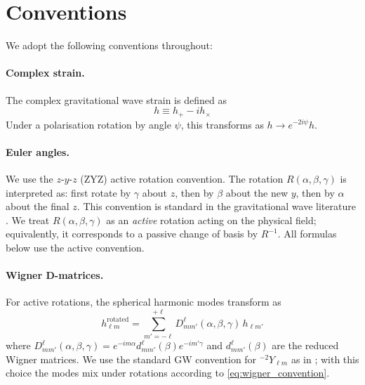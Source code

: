 \documentclass[11pt,a4paper]{article}
\newcommand{\Ylm}{{}^{-2}Y_{\ell m}}
\begin{document}
\section{Conventions}
\label{sec:conventions}

We adopt the following conventions throughout:

\paragraph{Complex strain.} The complex gravitational wave strain is defined as
\begin{equation}
    h \equiv h_+ - i h_\times
    \label{eq:strain_def}
\end{equation}
Under a polarisation rotation by angle $\psi$, this transforms as $h \to e^{-2i\psi} h$.

\paragraph{Euler angles.} We use the $z$-$y$-$z$ (ZYZ) active rotation convention. The rotation $R(\alpha, \beta, \gamma)$ is interpreted as: first rotate by $\gamma$ about $z$, then by $\beta$ about the new $y$, then by $\alpha$ about the final $z$. This convention is standard in the gravitational wave literature \cite{boyle2011,schmidt2011}. We treat $R(\alpha,\beta,\gamma)$ as an \emph{active} rotation acting on the physical field; equivalently, it corresponds to a passive change of basis by $R^{-1}$. All formulas below use the active convention.

\paragraph{Wigner D-matrices.} For active rotations, the spherical harmonic modes transform as
\begin{equation}
    h^{\text{rotated}}_{\ell m} = \sum_{m'=-\ell}^{+\ell} D^\ell_{m m'}(\alpha, \beta, \gamma) \, h_{\ell m'}
    \label{eq:wigner_convention}
\end{equation}
where $D^\ell_{m m'}(\alpha, \beta, \gamma) = e^{-i m \alpha} d^\ell_{m m'}(\beta) e^{-i m' \gamma}$ and $d^\ell_{m m'}(\beta)$ are the reduced Wigner matrices. We use the standard GW convention for $\Ylm$ as in \cite{boyle2011}; with this choice the modes mix under rotations according to \eqref{eq:wigner_convention}.
\end{document}
